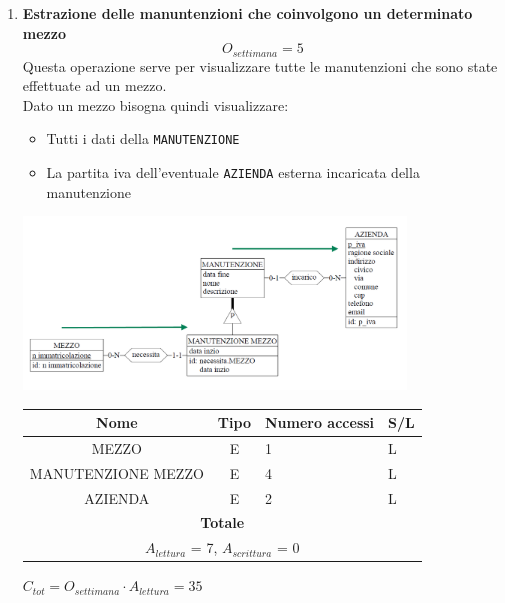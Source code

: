 \documentclass[12pt,a4paper]{report}
\begin{document}
\begin{enumerate}[label=\textbf{\arabic*}]
    \item \textbf{Estrazione delle manuntenzioni che coinvolgono un determinato mezzo} \label{op7} \\
    \[ {O_{settimana} = 5} \]
    Questa operazione serve per visualizzare tutte le manutenzioni che sono state effettuate ad un mezzo.\\
    Dato un mezzo bisogna quindi visualizzare:
    \begin{itemize}
    \renewcommand\labelitemi{--}
    \item Tutti i dati della \texttt{MANUTENZIONE}
    \item La partita iva dell'eventuale \texttt{AZIENDA} esterna incaricata della manutenzione
    \end{itemize}
    \begin{center}
    \includegraphics[width=0.8\textwidth]{VisualManutenzioniMezzo}
    \end{center}
    \begin{table}[H]
    \centering
    \begin{tabular}{|c|c|l|l|}
    \hline
    \textbf{Nome} & \textbf{Tipo} & \textbf{Numero accessi} & \textbf{S/L} \\
    \hline
    MEZZO & E & 1 & L \\
    \hline
    MANUTENZIONE MEZZO & E & 4 & L \\
    \hline
    AZIENDA & E & 2 & L \\
    \hline
    \multicolumn{4}{c}{\textbf{Totale}} \\
    \multicolumn{4}{c}{${A_{lettura}}$ = 7, ${A_{scrittura}}$ = 0} \\
    \hline
    \end{tabular}
    \end{table}
    \begin{center}
    ${C_{tot} = {O_{settimana}}\cdot{A_{lettura}}= 35}$
    \end{center}



\end{enumerate}
\end{document}
